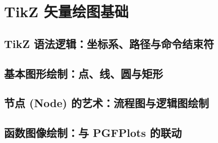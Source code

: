 \chapter{TikZ 矢量绘图基础}

\section{TikZ 语法逻辑：坐标系、路径与命令结束符}
\section{基本图形绘制：点、线、圆与矩形}
\section{节点 (Node) 的艺术：流程图与逻辑图绘制}
\section{函数图像绘制：与 PGFPlots 的联动}
